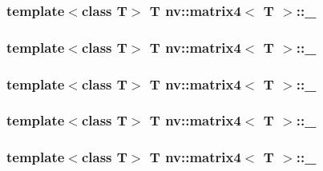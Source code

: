 \hypertarget{classnv_1_1matrix4_27391693b9cbccd400083e46265d8086}{
\subsubsection[{\_\-32}]{\setlength{\rightskip}{0pt plus 5cm}template$<$class T$>$ T {\bf nv::matrix4}$<$ T $>$::{\bf \_}}}
\label{classnv_1_1matrix4_27391693b9cbccd400083e46265d8086}


\hypertarget{classnv_1_1matrix4_f6ea4c219063a6eff57bcb7f669bcdd2}{
\subsubsection[{\_\-33}]{\setlength{\rightskip}{0pt plus 5cm}template$<$class T$>$ T {\bf nv::matrix4}$<$ T $>$::{\bf \_}}}
\label{classnv_1_1matrix4_f6ea4c219063a6eff57bcb7f669bcdd2}


\hypertarget{classnv_1_1matrix4_0092ee1a4e828a55838566dec4e90b77}{
\subsubsection[{\_\-34}]{\setlength{\rightskip}{0pt plus 5cm}template$<$class T$>$ T {\bf nv::matrix4}$<$ T $>$::{\bf \_}}}
\label{classnv_1_1matrix4_0092ee1a4e828a55838566dec4e90b77}


\hypertarget{classnv_1_1matrix4_52d24ada375affd41f8502bace352327}{
\subsubsection[{\_\-41}]{\setlength{\rightskip}{0pt plus 5cm}template$<$class T$>$ T {\bf nv::matrix4}$<$ T $>$::{\bf \_}}}
\label{classnv_1_1matrix4_52d24ada375affd41f8502bace352327}


\hypertarget{classnv_1_1matrix4_abc0ff6800ec83b672608ac0d5589a32}{
\subsubsection[{\_\-42}]{\setlength{\rightskip}{0pt plus 5cm}template$<$class T$>$ T {\bf nv::matrix4}$<$ T $>$::{\bf \_}}}
\label{classnv_1_1matrix4_abc0ff6800ec83b672608ac0d5589a32}


